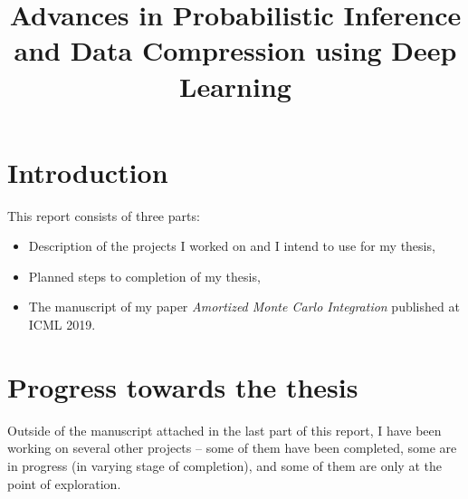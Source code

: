 \documentclass[12pt]{article}
\begin{document}


\title{Advances in Probabilistic Inference and Data Compression using Deep Learning}
\date{}
\maketitle

\vspace{-50pt}


\section{Introduction}

This report consists of three parts:
\begin{itemize}
\item Description of the projects I worked on and I intend to use for my thesis,
\item Planned steps to completion of my thesis,
\item The manuscript of my paper \emph{Amortized Monte Carlo Integration} published at ICML 2019.
\end{itemize}



\section{Progress towards the thesis}

Outside of the manuscript attached in the last part of this report,
I have been working on several other projects -- 
some of them have been completed, some are in progress (in varying stage of completion), 
and some of them are only at the point of exploration.
\end{document}
